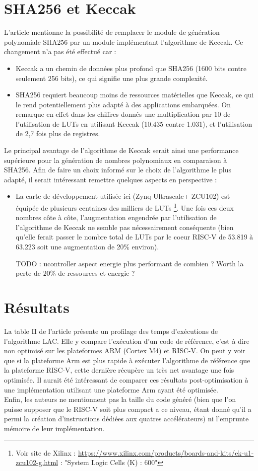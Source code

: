 \documentclass[10pt,a4paper]{article}
\begin{document}
\section{SHA256 et Keccak}
L'article mentionne la possibilité de remplacer le module de génération polynomiale SHA256 par un module implémentant l'algorithme de Keccak. Ce 
changement n'a pas été effectué car :
\begin{itemize}
    \item Keccak a un chemin de données plus profond que SHA256 (1600 bits contre seulement 256 bits), ce qui signifie une plus grande complexité.
    \item SHA256 requiert beaucoup moins de ressources matérielles que Keccak, ce qui le rend potentiellement plus adapté à des applications embarquées. 
On remarque en effet dans les chiffres donnés une multiplication par 10 de l'utilisation de LUTs en utilisant Keccak (10.435 contre 1.031), et l'utilisation 
de 2,7 fois plus de registres.
\end{itemize} 
Le principal avantage de l'algorithme de Keccak serait ainsi une performance supérieure pour la génération de nombres polynomiaux en 
comparaison à SHA256. Afin de faire un choix informé sur le choix de l'algorithme le plus adapté, il serait intéressant remettre quelques 
aspects en perspective :
\begin{itemize}
    \item La carte de développement utilisée ici (Zynq Ultrascale+ ZCU102) est équipée de plusieurs centaines des milliers de LUTs \footnote{Voir site de Xilinx : \url{https://www.xilinx.com/products/boards-and-kits/ek-u1-zcu102-g.html} : "System Logic Cells (K) : 600"}. 
Une fois ces deux nombres côte à côte, l'augmentation engendrée par l'utilisation de l'algorithme de Keccak ne semble pas nécessairement conséquente (bien qu'elle 
ferait passer le nombre total de LUTs par le coeur RISC-V de 53.819 à 63.223 soit une augmentation de 20\% environ).

TODO : ucontroller
       aspect energie
       plus performant de combien ? Worth la perte de 20\% de ressources et energie ?
\end{itemize}


\section{Résultats}
La table II de l'article présente un profilage des temps d'exécutions de l'algorithme LAC. Elle y compare l'exécution d'un code de référence, c'est à dire non optimisé sur les plateformes
 ARM (Cortex M4) et RISC-V. On peut y voir que si la plateforme Arm est plus rapide à exécuter l'algorithme de référence que la plateforme RISC-V, cette dernière récupère un très net avantage 
une fois optimisée. Il aurait été intéressant de comparer ces résultats post-optimisation à une implémentation utilisant une plateforme Arm ayant été optimisée.\\
Enfin, les auteurs ne mentionnent pas la taille du code généré (bien que l'on puisse supposer que le RISC-V soit plus compact a ce niveau, étant donné qu'il a permi la création d'instructions 
dédiées aux quatres accélérateurs) ni l'emprunte mémoire de leur implémentation.
\end{document}
